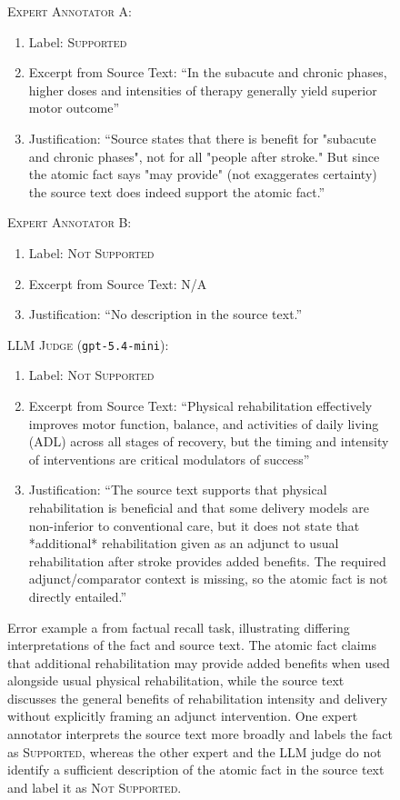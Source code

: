 \documentclass{article}
\begin{document}
\begin{figure}[h!]
\begin{small}
\begin{tcolorbox}[colback=gray!5, colframe=red, width=\textwidth]
\textsc{Expert Annotator A:} 
\begin{enumerate}[leftmargin=0.6cm]
\item Label:  \textsc{Supported}
\item Excerpt from Source Text:  ``In the subacute and chronic phases, higher doses and intensities of therapy generally yield superior motor outcome''
\item Justification: ``Source states that there is benefit for "subacute and chronic phases", not for all "people after stroke." But since the atomic fact says "may provide" (not exaggerates certainty) the source text does indeed support the atomic fact.''
\end{enumerate}
\vspace{2mm}
\textsc{Expert Annotator B:} 
\begin{enumerate}[leftmargin=0.6cm]
\item Label:  \textsc{Not Supported}
\item Excerpt from Source Text:  N/A
\item Justification: ``No description in the source text.''
\end{enumerate}
\vspace{2mm}
\textsc{LLM Judge} (\texttt{gpt-5.4-mini}): 
\begin{enumerate}[leftmargin=0.6cm]
\item Label:  \textsc{Not Supported}
\item Excerpt from Source Text:  ``Physical rehabilitation effectively improves motor function, balance, and activities of daily living (ADL) across all stages of recovery, but the timing and intensity of interventions are critical modulators of success''
\item Justification: ``The source text supports that physical rehabilitation is beneficial and that some delivery models are non-inferior to conventional care, but it does not state that *additional* rehabilitation given as an adjunct to usual rehabilitation after stroke provides added benefits. The required adjunct/comparator context is missing, so the atomic fact is not directly entailed.''
\end{enumerate}
\end{tcolorbox}
\caption{Error example a from factual recall task, illustrating differing interpretations of the fact and source text. The atomic fact claims that additional rehabilitation may provide added benefits when used alongside usual physical rehabilitation, while the source text discusses the general benefits of rehabilitation intensity and delivery without explicitly framing an adjunct intervention. One expert annotator interprets the source text more broadly and labels the fact as \textsc{Supported}, whereas the other expert and the LLM judge do not identify a sufficient description of the atomic fact in the source text and label it as \textsc{Not Supported}.} 
\label{fig:error-example-2}
\end{small}
\end{figure}
\end{document}

